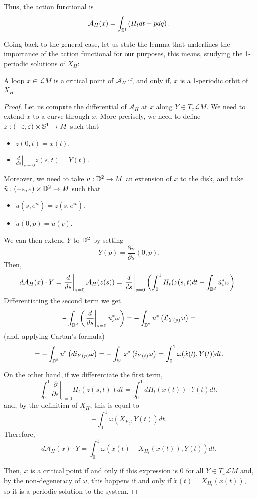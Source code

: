 Thus, the action functional is
\[\mathcal{A}_H (x) = \int_{\mathbb{S}^1} \left( H_t d t - p d q \right) .\]

Going back to the general case, let us state the lemma that underlines the importance of the action functional for our purposes, this means, studying the 1-periodic solutions of $X_H$:

\begin{prop}
A loop $x \in \mathcal{L}M$ is a critical point of $\mathcal{A}_H$ if, and only if, $x$ is a 1-periodic orbit of $X_H$.
\end{prop}

\begin{proof}
Let us compute the differential of $\mathcal{A}_H$ at $x$ along $Y \in T_x\mathcal{L}M$. We need to extend $x$ to a curve through $x$. More precisely, we need to define $z : (-\varepsilon,\varepsilon) \times \mathbb{S}^1 \rightarrow M$ such that

\begin{itemize}
	\item $z(0,t) = x(t)$.
	\item $\left. \frac{d}{d s} \right|_{s=0} z(s,t) = Y(t)$.
\end{itemize}

Moreover, we need to take $u : \mathbb{D}^2 \rightarrow M$ an extension of $x$ to the disk, and take $\tilde{u} : (-\varepsilon,\varepsilon) \times \mathbb{D}^2 \rightarrow M$ such that

\begin{itemize}
	\item $\tilde{u}(s,e^{it}) = z(s,e^{it})$.
	\item $\tilde{u}(0,p) = u(p)$.
\end{itemize}

We can then extend $Y$ to $\mathbb{D}^2$ by setting
\[Y(p) = \frac{\partial \tilde{u}}{\partial s} (0,p) .\]
Then,
\[d \mathcal{A}_H(x) \cdot Y = \left. \frac{d}{d s} \right|_{s=0} \mathcal{A}_H(z(s)) = \left. \frac{d}{d s} \right|_{s=0} \left( \int_0^1 H_t(z(s,t) d t - \int_{\mathbb{D}^2} \tilde{u}_s^{\ast} \omega \right) .\]
Differentiating the second term we get
\[- \int_{\mathbb{D}^2} \left( \left. \frac{d}{d s} \right|_{s=0} \tilde{u}_s^{\ast} \omega \right) = - \int_{\mathbb{D}^2} u^{\ast} \left( \mathcal{L}_{Y(p)} \omega \right) =\]
(and, applying Cartan's formula)
\[= - \int_{\mathbb{D}^2} u^{\ast} \left( d i_{Y(p)} \omega \right) = - \int_{\mathbb{S}^1} x^{\ast} \left( i_{Y(t)} \omega \right) = \int_0^1 \omega(\dot{x}(t),Y(t)) d t .\]

On the other hand, if we differentiate the first term,
\[\int_0^1 \left. \frac{\partial}{\partial s} \right|_{s=0} H_t(z(s,t)) d t = \int_0^1 d H_t(x(t)) \cdot Y(t) d t ,\]
and, by the definition of $X_H$, this is equal to
\[- \int_0^1 \omega(X_{H_t},Y(t)) d t .\]
Therefore,
\[d \mathcal{A}_H(x) \cdot Y = \int_0^1 \omega(\dot{x}(t) - X_{H_t}(x(t)), Y(t)) d t .\]

Then, $x$ is a critical point if and only if this expression is $0$ for all $Y \in T_x\mathcal{L}M$ and, by the non-degeneracy of $\omega$, this happens if and only if $\dot{x}(t) = X_{H_t}(x(t))$, so it is a periodic solution to the system.
\end{proof}
